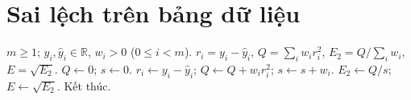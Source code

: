 \documentclass[12pt,a4paper,oneside]{book}
\numberwithin{algorithm}{chapter}
\theoremstyle{definition}
\newcommand{\R}{\mathbb{R}}
\begin{document}
\section{Sai lệch trên bảng dữ liệu}
\begin{algorithm}[H]
\caption{Tổng bình phương và sai số trung bình phương}
\label{alg:ls-error-measures}
\begin{algorithmic}[1]
\Require $m\geq1$; $y_i,\widehat y_i\in\R$, $w_i>0$ ($0\leq i<m$).
\Ensure $r_i=y_i-\widehat y_i$, $Q=\sum_iw_ir_i^2$, $E_2=Q/\sum_iw_i$, $E=\sqrt{E_2}$.
\State $Q\gets0$; $s\gets0$.
 \State $r_i\gets y_i-\widehat y_i$; $Q\gets Q+w_ir_i^2$; $s\gets s+w_i$.
\EndFor
\Statex
\State $E_2\gets Q/s$; $E\gets\sqrt{E_2}$.
\State Kết thúc.
\end{algorithmic}
\end{algorithm}

\end{document}
